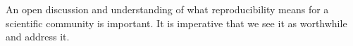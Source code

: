 \documentclass[conference]{IEEEtran}
\begin{document}
An open discussion and understanding of what reproducibility means for
a scientific community is important. It is imperative that we see it 
as worthwhile and address it. 







\end{document}
